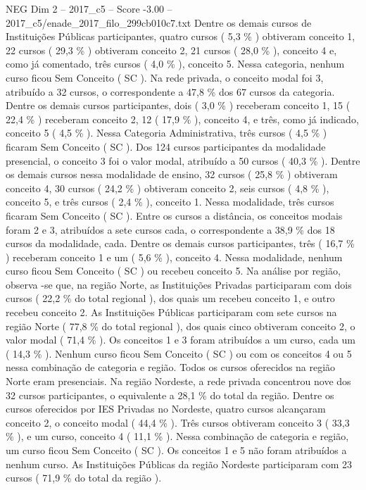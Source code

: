 \begin{textsample}{NEG Dim 2 – 2017\_c5 – Score -3.00 – 2017\_c5/enade\_2017\_filo\_299cb010c7.txt}
Dentre os demais cursos de Instituições Públicas participantes, quatro cursos ( 5,3 \% ) obtiveram conceito 1, 22 cursos ( 29,3 \% ) obtiveram conceito 2, 21 cursos ( 28,0 \% ), conceito 4 e, como já comentado, três cursos ( 4,0 \% ), conceito 5.
Nessa categoria, nenhum curso ficou Sem Conceito ( SC ).
Na rede privada, o conceito modal foi 3, atribuído a 32 cursos, o correspondente a 47,8 \% dos 67 cursos da categoria.
Dentre os demais cursos participantes, dois ( 3,0 \% ) receberam conceito 1, 15 ( 22,4 \% ) receberam conceito 2, 12 ( 17,9 \% ), conceito 4, e três, como já indicado, conceito 5 ( 4,5 \% ).
Nessa Categoria Administrativa, três cursos ( 4,5 \% ) ficaram Sem Conceito ( SC ).
Dos 124 cursos participantes da modalidade presencial, o conceito 3 foi o valor modal, atribuído a 50 cursos ( 40,3 \% ).
Dentre os demais cursos nessa modalidade de ensino, 32 cursos ( 25,8 \% ) obtiveram conceito 4, 30 cursos ( 24,2 \% ) obtiveram conceito 2, seis cursos ( 4,8 \% ), conceito 5, e três cursos ( 2,4 \% ), conceito 1.
Nessa modalidade, três cursos ficaram Sem Conceito ( SC ).
Entre os cursos a distância, os conceitos modais foram 2 e 3, atribuídos a sete cursos cada, o correspondente a 38,9 \% dos 18 cursos da modalidade, cada.
Dentre os demais cursos participantes, três ( 16,7 \% ) receberam conceito 1 e um ( 5,6 \% ), conceito 4.
Nessa modalidade, nenhum curso ficou Sem Conceito ( SC ) ou recebeu conceito 5.
Na análise por região, observa -se que, na região Norte, as Instituições Privadas participaram com dois cursos ( 22,2 \% do total regional ), dos quais um recebeu conceito 1, e outro recebeu conceito 2.
As Instituições Públicas participaram com sete cursos na região Norte ( 77,8 \% do total regional ), dos quais cinco obtiveram conceito 2, o valor modal ( 71,4 \% ).
Os conceitos 1 e 3 foram atribuídos a um curso, cada um ( 14,3 \% ).
Nenhum curso ficou Sem Conceito ( SC ) ou com os conceitos 4 ou 5 nessa combinação de categoria e região.
Todos os cursos oferecidos na região Norte eram presenciais.
Na região Nordeste, a rede privada concentrou nove dos 32 cursos participantes, o equivalente a 28,1 \% do total da região.
Dentre os cursos oferecidos por IES Privadas no Nordeste, quatro cursos alcançaram conceito 2, o conceito modal ( 44,4 \% ).
Três cursos obtiveram conceito 3 ( 33,3 \% ), e um curso, conceito 4 ( 11,1 \% ).
Nessa combinação de categoria e região, um curso ficou Sem Conceito ( SC ).
Os conceitos 1 e 5 não foram atribuídos a nenhum curso.
As Instituições Públicas da região Nordeste participaram com 23 cursos ( 71,9 \% do total da região ).

\end{textsample}

